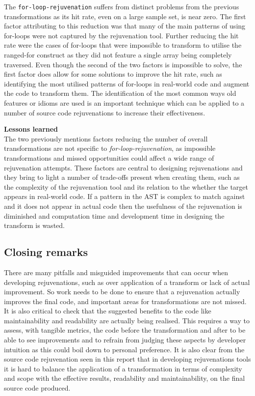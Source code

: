 \documentclass[bsc,frontabs,singlespacing,twoside,parskip,deptreport]{infthesis}
\begin{document}
The \texttt{for-loop-rejuvenation} suffers from distinct problems from the previous transformations as its hit rate, even on a large sample set, is near zero. The first factor attributing to this reduction was that many of the main patterns of using for-loops were not captured by the rejuvenation tool. Further reducing the hit rate were the cases of for-loops that were impossible to transform to utilise the ranged-for construct as they did not feature a single array being completely traversed. Even though the second of the two factors is impossible to solve, the first factor does allow for some solutions to improve the hit rate, such as identifying the most utilised patterns of for-loops in real-world code and augment the code to transform them. The identification of the most common ways old features or idioms are used is an important technique which can be applied to a number of source code rejuvenations to increase their effectiveness.

\textbf{Lessons learned}\\
The two previously mentions factors reducing the number of overall transformations are not specific to \textit{for-loop-rejuvenation}, as impossible transformations and missed opportunities could affect a wide range of rejuvenation attempts. These factors are central to designing rejuvenations and they bring to light a number of trade-offs present when creating them, such as the complexity of the rejuvenation tool and its relation to the whether the target appears in real-world code. If a pattern in the AST is complex to match against and it does not appear in actual code then the usefulness of the rejuvenation is diminished and computation time and development time in designing the transform is wasted. 


\subsection{Closing remarks}

There are many pitfalls and misguided improvements that can occur when developing rejuvenations, such as over application of a transform or lack of actual improvement. So work needs to be done to ensure that a rejuvenation actually improves the final code, and important areas for transformations are not missed. It is also critical to check that the suggested benefits to the code like maintainability and readability are actually being realised. This requires a way to assess, with tangible metrics, the code before the transformation and after to be able to see improvements and to refrain from judging these aspects by developer intuition as this could boil down to personal preference. It is also clear from the source code rejuvenation seen in this report that in developing rejuvenations tools it is hard to balance the application of a transformation in terms of complexity and scope with the effective results, readability and maintainability, on the final source code produced. 
\end{document}
